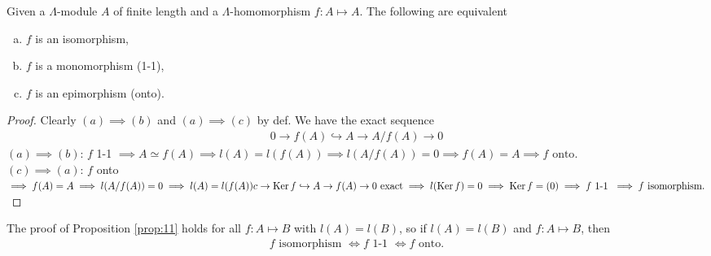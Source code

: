 \begin{prop}\label{prop:11}
Given a \(\Lambda\)-module \(A\) of finite length and a \(\Lambda\)-homomorphism \(f:A\mapsto A\). The following are equivalent
\begin{enumerate}[(a)]
    \item \(f\) is an isomorphism,
    \item \(f\) is a monomorphism (1-1),
    \item \(f\) is an epimorphism (onto).
\end{enumerate}
\end{prop}
\begin{proof}
Clearly \((a)\implies (b)\) and \((a)\implies (c)\) by def. We have the exact sequence
\begin{align*}
    0\rightarrow f(A) \hookrightarrow A \rightarrow A/f(A) \rightarrow 0
\end{align*}
\noindent\underline{\((a)\implies (b)\)}: \(f\) 1-1 \(\implies A \simeq f(A) \implies l(A) = l(f(A))
\implies l(A/f(A)) = 0 \implies f(A) = A \implies f \text{  onto}.\)\\[0.3cm]
\noindent\underline{\((c) \implies (a)\)}: \(f\) onto \(\implies f(A) = A \implies l(A/f(A)) = 0 \implies l(A) = l(f(A))\\
c\rightarrow \operatorname{Ker}\nolimits f \hookrightarrow A \rightarrow f(A) \rightarrow 0 \text{  exact} \implies l(\operatorname{Ker}\nolimits f) = 0 \implies \operatorname{Ker}\nolimits f = (0) \implies f \text{ 1-1 } \implies f \text{ isomorphism}.\)
\end{proof}
\begin{rem}
The proof of Proposition \ref{prop:11} holds for all \(f:A\mapsto B\) with \(l(A) = l(B)\), so if \(l(A) = l(B)\) and \(f:A\mapsto B\), then 
\begin{align*}
    f \text{ isomorphism } \Leftrightarrow f \text{ 1-1 } \Leftrightarrow f \text{  onto}.
\end{align*}
\end{rem}

